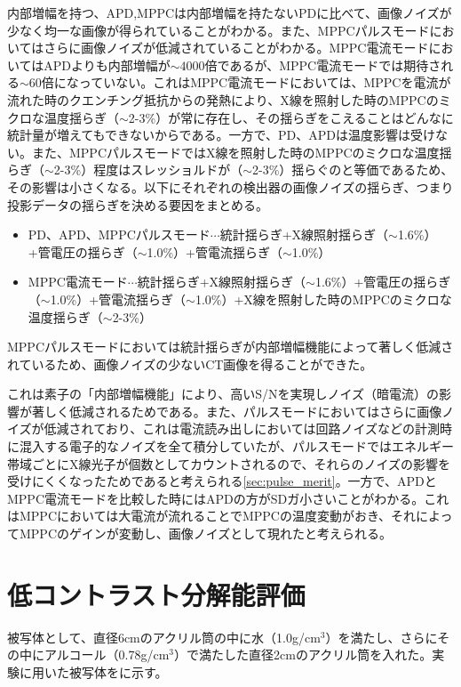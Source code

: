 内部増幅を持つ、APD,MPPCは内部増幅を持たないPDに比べて、画像ノイズが少なく均一な画像が得られていることがわかる。また、MPPCパルスモードにおいてはさらに画像ノイズが低減されていることがわかる。MPPC電流モードにおいてはAPDよりも内部増幅が$\sim4000倍$であるが、MPPC電流モードでは期待される$\sim 60$倍になっていない。これはMPPC電流モードにおいては、MPPCを電流が流れた時のクエンチング抵抗からの発熱により、X線を照射した時のMPPCのミクロな温度揺らぎ（$\sim$2-3\%）が常に存在し、その揺らぎをこえることはどんなに統計量が増えてもできないからである。一方で、PD、APDは温度影響は受けない。また、MPPCパルスモードではX線を照射した時のMPPCのミクロな温度揺らぎ（$\sim$2-3\%）程度はスレッショルドが（$\sim$2-3\%）揺らぐのと等価であるため、その影響は小さくなる。以下にそれぞれの検出器の画像ノイズの揺らぎ、つまり投影データの揺らぎを決める要因をまとめる。\\
 \begin{itemize}
\item PD、APD、MPPCパルスモード$\cdots$統計揺らぎ+X線照射揺らぎ（$\sim$1.6\%）+管電圧の揺らぎ（$\sim$1.0\%）+管電流揺らぎ（$\sim$1.0\%）\\
\item MPPC電流モード$\cdots$統計揺らぎ+X線照射揺らぎ（$\sim$1.6\%）+管電圧の揺らぎ（$\sim$1.0\%）+管電流揺らぎ（$\sim$1.0\%）+X線を照射した時のMPPCのミクロな温度揺らぎ（$\sim$2-3\%）
\end{itemize}

MPPCパルスモードにおいては統計揺らぎが内部増幅機能によって著しく低減されているため、画像ノイズの少ないCT画像を得ることができた。


これは素子の「内部増幅機能」により、高いS/Nを実現しノイズ（暗電流）の影響が著しく低減されるためである。また、パルスモードにおいてはさらに画像ノイズが低減されており、これは電流読み出しにおいては回路ノイズなどの計測時に混入する電子的なノイズを全て積分していたが、パルスモードではエネルギー帯域ごとにX線光子が個数としてカウントされるので、それらのノイズの影響を受けにくくなったためであると考えられる\ref{sec:pulse_merit}。一方で、APDとMPPC電流モードを比較した時にはAPDの方がSDガ小さいことがわかる。これはMPPCにおいては大電流が流れることでMPPCの温度変動がおき、それによってMPPCのゲインが変動し、画像ノイズとして現れたと考えられる。
\fi


\section{低コントラスト分解能評価}
被写体として、直径6cmのアクリル筒の中に水（1.0g/cm$^3$）を満たし、さらにその中にアルコール（0.78g/cm$^3$）で満たした直径2cmのアクリル筒を入れた。実験に用いた被写体をに示す。

